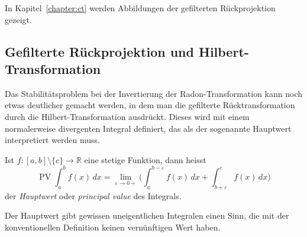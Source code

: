 In Kapitel~\ref{chapter:ct} werden Abbildungen der gefilterten
Rückprojektion gezeigt.

%
%
\subsection{Gefilterte Rückprojektion und Hilbert-Transformation}
Das Stabilitätsproblem bei der Invertierung der Radon-Transformation
kann noch etwas deutlicher gemacht werden, in dem man die gefilterte
Rücktransformation durch die Hilbert-Transformation ausdrückt.
Dieses wird mit einem normalerweise divergenten Integral definiert,
das als der sogenannte Hauptwert interpretiert werden muss.

\begin{definition}
Ist $f\colon[a,b]\setminus\{c\}\to\mathbb{R}$ eine stetige Funktion,
dann heisst
\[
\operatorname{PV}
\int_a^b f(x)\,dx
=
\lim_{\varepsilon\to 0+}
\biggl(
\int_a^{b-\varepsilon} f(x)\,dx
+
\int_{b+\varepsilon}^c f(x)\,dx
\biggr)
\]
der {\em Hauptwert} oder {\em principal value} des Integrals.
\end{definition}

Der Hauptwert gibt gewissen uneigentlichen Integralen einen Sinn, 
die mit der konventionellen Definition keinen vernünftigen Wert haben.

